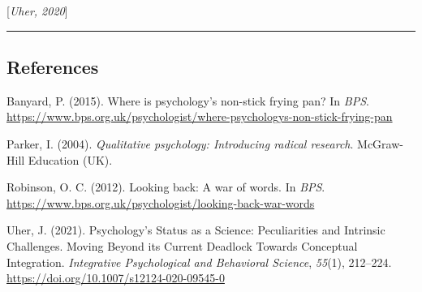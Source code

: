 \documentclass[
  letterpaper,
  DIV=11,
  numbers=noendperiod]{scrartcl}
\newlength{\cslhangindent}
\newenvironment{CSLReferences}[2] %
 {\begin{list}{}{%
  \setlength{\itemindent}{0pt}
  \setlength{\leftmargin}{0pt}
  \setlength{\parsep}{0pt}
  \ifodd #1
   \setlength{\leftmargin}{\cslhangindent}
   \setlength{\itemindent}{-1\cslhangindent}
  \fi
  \setlength{\itemsep}{#2\baselineskip}}}
 {\end{list}}
\begin{document}
{[}\emph{Uher, 2020}{]}

\begin{center}\rule{0.5\linewidth}{0.5pt}\end{center}

\subsection*{References}\label{references}

\label{refs}
\begin{CSLReferences}{1}{0}
Banyard, P. (2015). Where is psychology's non-stick frying pan? In
\emph{BPS}.
\url{https://www.bps.org.uk/psychologist/where-psychologys-non-stick-frying-pan}

Parker, I. (2004). \emph{Qualitative psychology: Introducing radical
research}. McGraw-Hill Education (UK).

Robinson, O. C. (2012). Looking back: A war of words. In \emph{BPS}.
\url{https://www.bps.org.uk/psychologist/looking-back-war-words}

Uher, J. (2021). Psychology{'}s Status as a Science: Peculiarities and
Intrinsic Challenges. Moving Beyond its Current Deadlock Towards
Conceptual Integration. \emph{Integrative Psychological and Behavioral
Science}, \emph{55}(1), 212--224.
\url{https://doi.org/10.1007/s12124-020-09545-0}

\end{CSLReferences}
\end{document}
